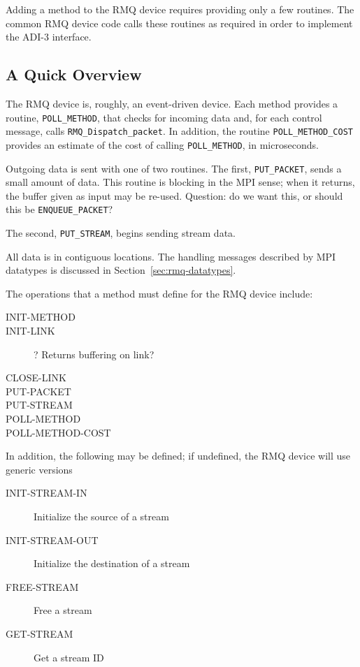 \documentclass{article}
\let\code=\texttt
\begin{document}
Adding a method to the RMQ device requires providing only a few routines.  The
common RMQ device code calls these routines as required in order to implement
the ADI-3 interface.  

\subsection{A Quick Overview}
The RMQ device is, roughly, an event-driven device.  Each method provides a
routine, \code{POLL\_METHOD}, that checks for incoming data and, for each
control message, calls \code{RMQ\_Dispatch\_packet}.  In addition, the routine
\code{POLL\_METHOD\_COST} provides an estimate of the cost of calling
\code{POLL\_METHOD}, in microseconds.  

Outgoing data is sent with one of two routines.  The first, \code{PUT\_PACKET},
sends a small amount of data.  
This routine is blocking in the MPI sense; when
it returns, the buffer given as input may be re-used. Question: do we want
this, or should this be \code{ENQUEUE\_PACKET}?

The second, \code{PUT\_STREAM}, begins sending stream data.

All data is in contiguous locations.  The handling messages described by MPI
datatypes is discussed in Section~\ref{sec:rmq-datatypes}.

The operations that a method must define for the RMQ device include:
\begin{description}
\item[INIT-METHOD]
\item[INIT-LINK]? Returns buffering on link?
\item[CLOSE-LINK]
\item[PUT-PACKET]
\item[PUT-STREAM]
\item[POLL-METHOD]
\item[POLL-METHOD-COST]
\end{description}

In addition, the following may be defined; if undefined, the RMQ device will
use generic versions
\begin{description}
\item[INIT-STREAM-IN]Initialize the source of a stream
\item[INIT-STREAM-OUT]Initialize the destination of a stream
\item[FREE-STREAM]Free a stream
\item[GET-STREAM]Get a stream ID
\end{description}
\end{document}
